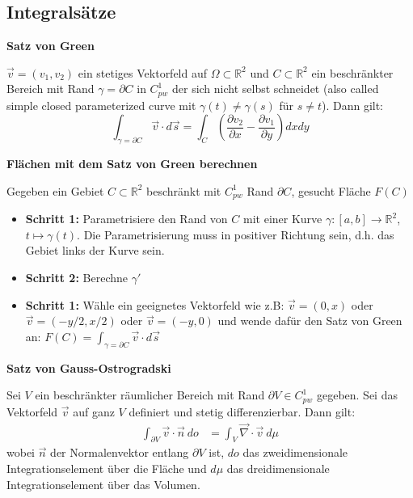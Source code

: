 \documentclass[25pt]{sciposter}
\newcommand{\R}{\mathbb{R}}
\newenvironment{method}[1]{\begin{mdframed}[backgroundcolor=blue!10,innertopmargin=15pt, innerbottommargin=15pt, nobreak=true]
		\textbf{#1 }
	}
	{ 
	\end{mdframed}
}
\begin{document}
\begin{multicols}{3}
\section*{Integralsätze}

\begin{method}{Satz von Green}
	$\vec{v} = (v_1,v_2)$ ein stetiges Vektorfeld auf $\Omega \subset \R^2$ und $C\subset \R^2$ ein beschränkter Bereich mit Rand $\gamma = \partial C$ in $C_{pw}^1$ der sich nicht selbst schneidet (also called simple closed parameterized curve mit $\gamma(t)\not=\gamma(s)$ für $s\neq t$). Dann gilt:
	$$\int_{\gamma = \partial C} \vec{v} \cdot d\vec{s} = \int_{C} \left( \frac{\partial v_2}{\partial x} -  \frac{\partial v_1}{\partial y}\right)dxdy$$
\end{method}

\begin{method}{Flächen mit dem Satz von Green berechnen}
	Gegeben ein Gebiet $C\subset \R^2$ beschränkt mit $C_{pw}^1$ Rand $\partial C$, gesucht Fläche $F(C)$
	\begin{itemize}
		\item \textbf{Schritt 1:} Parametrisiere den Rand von $C$ mit einer Kurve $\gamma:[a,b]\to \R^2$, $t\mapsto \gamma(t)$. Die Parametrisierung muss in positiver Richtung sein, d.h. das Gebiet links der Kurve sein.
		\item \textbf{Schritt 2:} Berechne $\gamma'$
		\item \textbf{Schritt 1:} Wähle ein geeignetes Vektorfeld wie z.B: $\vec{v} = (0,x)$ oder $\vec{v} = (-y/2,x/2)$ oder $\vec{v} = (-y,0)$ und wende dafür den Satz von Green an: $F(C) = \int_{\gamma=\partial C} \vec{v}\cdot d\vec{s}$
	\end{itemize}
\end{method}




\begin{method}{Satz von Gauss-Ostrogradski}
	Sei $V$ ein beschränkter räumlicher Bereich mit Rand $\partial V \in C^1_{pw}$ gegeben. Sei das Vektorfeld $\vec{v}$ auf ganz $V$ definiert und stetig differenzierbar. Dann gilt:
	\begin{align*}
		\int_{\partial V} \vec{v} \cdot \vec{n} \ do &= \int_{V} \vec{\nabla} \cdot \vec{v} \ d\mu
	\end{align*}
	wobei $\vec{n}$ der Normalenvektor entlang $\partial V$ ist, $do$ das zweidimensionale Integrationselement über die Fläche und $d\mu$ das dreidimensionale Integrationselement über das Volumen.
\end{method}


\end{multicols}
\end{document}
